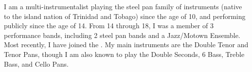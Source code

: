\vspace{0mm}
\vspace{-4mm}
\newline

\vspace{-4mm}
\newline

\begin{cvparagraph}
I am a multi-instrumentalist playing the steel pan family of instruments
(native to the island nation of Trinidad and Tobago) since the age of 10, and performing publicly since the age of 14. From 14 through 18, I was a member of 3 performance bands, including 2 steel pan bands and a Jazz/Motown Ensemble. Most recently, I have joined the \href{https://www.seattlesteelpanproject.com/}{}. My main instruments are the Double Tenor and Tenor Pans, though I am also known to play the Double Seconds, 6 Bass, Treble Bass, and Cello Pans. 
\end{cvparagraph}
